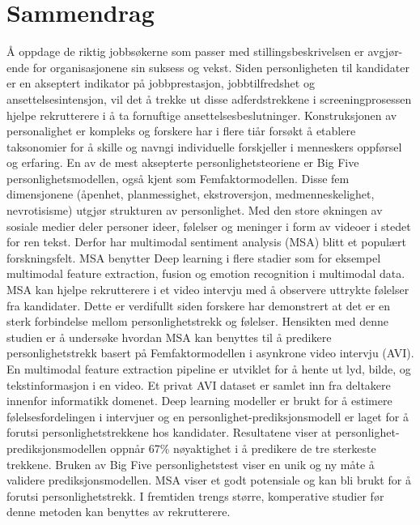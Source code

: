 \chapter*{Sammendrag}
Å oppdage de riktig jobbsøkerne som passer med stillingsbeskrivelsen er avgjør-ende for organisasjonene sin suksess og vekst. Siden personligheten til kandidater er en akseptert indikator på jobbprestasjon, jobbtilfredshet og ansettelsesintensjon, vil det å trekke ut disse adferdstrekkene i screeningprosessen hjelpe rekrutterere i å ta fornuftige ansettelsesbeslutninger. Konstruksjonen av personalighet er kompleks og forskere har i flere tiår forsøkt å etablere taksonomier for å skille og navngi individuelle forskjeller i menneskers oppførsel og erfaring. En av de mest aksepterte personlighetsteoriene er Big Five personlighetsmodellen, også kjent som Femfaktormodellen. Disse fem dimensjonene (åpenhet, planmessighet, ekstroversjon, medmenneskelighet, nevrotisisme) utgjør strukturen av personlighet. Med den store økningen av sosiale medier deler personer ideer, følelser og meninger i form av videoer i stedet for ren tekst. Derfor har multimodal sentiment analysis (MSA) blitt et populært forskningsfelt. MSA benytter Deep learning i flere stadier som for eksempel multimodal feature extraction, fusion og emotion recognition i multimodal data. MSA kan hjelpe rekrutterere i et video intervju med å observere uttrykte følelser fra kandidater. Dette er verdifullt siden forskere har demonstrert at det er en sterk forbindelse mellom personlighetstrekk og følelser. Hensikten med denne studien er å undersøke hvordan MSA kan benyttes til å predikere personlighetstrekk basert på Femfaktormodellen i asynkrone video intervju (AVI). En multimodal feature extraction pipeline er utviklet for å hente ut lyd, bilde, og tekstinformasjon i en video. Et privat AVI dataset er samlet inn fra deltakere innenfor informatikk domenet. Deep learning modeller er brukt for å estimere følelsesfordelingen i intervjuer og en personlighet-prediksjonsmodell er laget for å forutsi personlighetstrekkene hos kandidater. Resultatene viser at personlighet-prediksjonsmodellen oppnår 67\% nøyaktighet i å predikere de tre sterkeste trekkene. Bruken av Big Five personlighetstest viser en unik og ny måte å validere prediksjonsmodellen. MSA viser et godt potensiale og kan bli brukt for å forutsi personlighetstrekk. I fremtiden trengs større, komperative studier før denne metoden kan benyttes av rekrutterere. 



